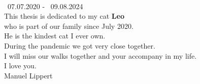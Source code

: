 \NewPage
\thispagestyle{empty}

\begin{center}
    \vspace*{3cm}
    \vspace{2cm}\\
    \gtrsymBorn~07.07.2020 - \gtrsymDied~09.08.2024 \\
    \bigskip
    This thesis is dedicated to my cat \textbf{Leo}\\ who is part of our family since July 2020.\\ He is the kindest cat I ever own.\\ During the pandemic we got very close together. \\ I will miss our walks together and your accompany in my life. \\ 
    \bigskip
    I love you.\\
    \bigskip
    Manuel Lippert\\
\end{center}